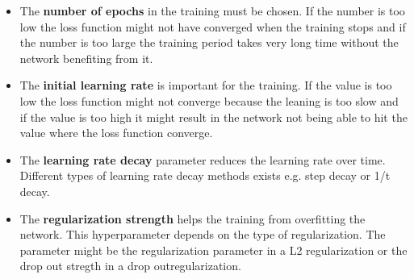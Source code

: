 \begin{itemize}
	\item The \textbf{number of epochs} in the training must be chosen. If the number is too low the loss function might not have converged when the training stops and if the number is too large the training period takes very long time without the network benefiting from it.
	\item The \textbf{initial learning rate} is important for the training. If the value is too low the loss function might not converge because the leaning is too slow and if the value is too high it might result in the network not being able to hit the value where the loss function converge.
	\item The \textbf{learning rate decay} parameter reduces the learning rate over time. Different types of learning rate decay methods exists e.g. step decay or 1/t decay.
	\item The \textbf{regularization strength} helps the training from overfitting the network. This hyperparameter depends on the type of regularization. The parameter might be the regularization parameter in a L2 regularization or the drop out stregth in a drop outregularization.
\end{itemize} 


